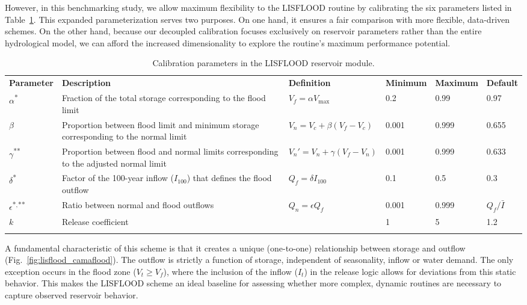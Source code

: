 \documentclass[hess, manuscript]{copernicus}
\begin{document}
However, in this benchmarking study, we allow maximum flexibility to the LISFLOOD routine by calibrating the six parameters listed in Table~\ref{tab:parameters_lisflood}. This expanded parameterization serves two purposes. On one hand, it ensures a fair comparison with more flexible, data-driven schemes. On the other hand, because our decoupled calibration focuses exclusively on reservoir parameters rather than the entire hydrological model, we can afford the increased dimensionality to explore the routine's maximum performance potential.

\begin{table}[t]
    \centering
    \caption{Calibration parameters in the LISFLOOD reservoir module.}
    \label{tab:parameters_lisflood}
    \begin{tabularx}{\textwidth}{lXllll}
        \tophline
        \textbf{Parameter} & \textbf{Description} & \textbf{Definition} & \textbf{Minimum} & \textbf{Maximum} & \textbf{Default} \\
        \middlehline
        $\alpha$\textsuperscript{*} & Fraction of the total storage corresponding to the flood limit & $V_f = \alpha V_{\max}$ & 0.2 & 0.99 & 0.97 \\
        $\beta$ & Proportion between flood limit and minimum storage corresponding to the normal limit & $V_n = V_c + \beta (V_f - V_c)$ & 0.001 & 0.999 & 0.655 \\
        $\gamma$\textsuperscript{**} & Proportion between flood and normal limits corresponding to the adjusted normal limit & $V_n' = V_n + \gamma (V_f - V_n)$ & 0.001 & 0.999 & 0.633 \\
        $\delta$\textsuperscript{*} & Factor of the 100-year inflow ($I_{100}$) that defines the flood outflow & $Q_f = \delta I_{100}$ & 0.1 & 0.5 & 0.3 \\
        $\epsilon$\textsuperscript{*}$^,$\textsuperscript{**} & Ratio between normal and flood outflows & $Q_n = \epsilon Q_f$ & 0.001 & 0.999 & $Q_f / \bar{I}$ \\
        $k$ & Release coefficient & & 1 & 5 & 1.2 \\
        \bottomhline
    \end{tabularx}
\end{table}

A fundamental characteristic of this scheme is that it creates a unique (one-to-one) relationship between storage and outflow (Fig.~\ref{fig:lisflood_camaflood}). The outflow is strictly a function of storage, independent of seasonality, inflow or water demand. The only exception occurs in the flood zone ($V_t \geq V_f$), where the inclusion of the inflow ($I_t$) in the release logic allows for deviations from this static behavior. This makes the LISFLOOD scheme an ideal baseline for assessing whether more complex, dynamic routines are necessary to capture observed reservoir behavior.
\end{document}
